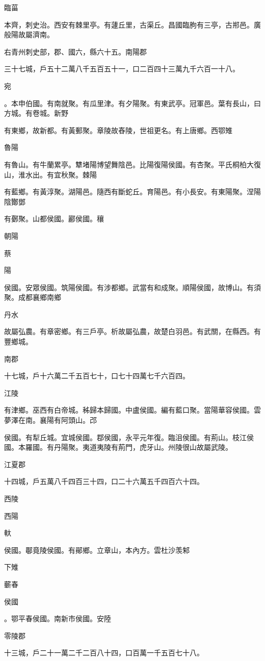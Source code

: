 \begin{pinyinscope}
臨菑

本齊，刺史治。西安有棘里亭。有蘧丘里，古渠丘。昌國臨朐有三亭，古郱邑。廣般陽故屬濟南。

右青州刺史部，郡、國六，縣六十五。南陽郡

三十七城，戶五十二萬八千五百五十一，口二百四十三萬九千六百一十八。

宛

。本申伯國。有南就聚。有瓜里津。有夕陽聚。有東武亭。冠軍邑。葉有長山，曰方城。有卷城。新野

有東鄉，故新都。有黃郵聚。章陵故舂陵，世祖更名。有上唐鄉。西鄂雉

魯陽

有魯山。有牛蘭累亭。犨堵陽博望舞陰邑。比陽復陽侯國。有杏聚。平氏桐柏大復山，淮水出。有宜秋聚。棘陽

有藍鄉。有黃淳聚。湖陽邑。隨西有斷蛇丘。育陽邑。有小長安。有東陽聚。涅陽陰酇鄧

有鄾聚。山都侯國。酈侯國。穰

朝陽

蔡

陽

侯國。安眾侯國。筑陽侯國。有涉都鄉。武當有和成聚。順陽侯國，故博山。有須聚。成都襄鄉南鄉

丹水

故屬弘農。有章密鄉。有三戶亭。析故屬弘農，故楚白羽邑。有武關，在縣西。有豐鄉城。

南郡

十七城，戶十六萬二千五百七十，口七十四萬七千六百四。

江陵

有津鄉。巫西有白帝城。秭歸本歸國。中盧侯國。編有藍口聚。當陽華容侯國。雲夢澤在南。襄陽有阿頭山。邔

侯國。有犁丘城。宜城侯國。鄀侯國，永平元年復。臨沮侯國。有荊山。枝江侯國。本羅國。有丹陽聚。夷道夷陵有荊門，虎牙山。州陵很山故屬武陵。

江夏郡

十四城，戶五萬八千四百三十四，口二十六萬五千四百六十四。

西陵

西陽

軑

侯國。鄳竟陵侯國。有鄖鄉。立章山，本內方。雲杜沙羡邾

下雉

蘄春

侯國

。鄂平春侯國。南新市侯國。安陸

零陵郡

十三城，戶二十一萬二千二百八十四，口百萬一千五百七十八。


\end{pinyinscope}
